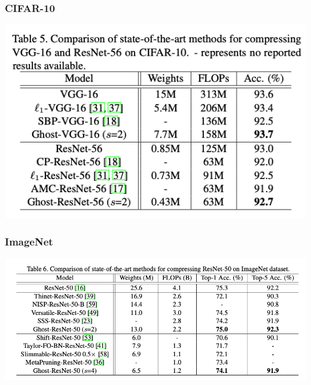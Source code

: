 \documentclass[12pt]{article}
\begin{document}
            \subsubsection{
                CIFAR-10
            }
                \begin{center}
                    \includegraphics[scale=0.4]{src/img/Com_cifar10.jpg} \\
                \end{center}
            \subsubsection{
                ImageNet
            }
                \begin{center}
                    \includegraphics[scale=0.4]{src/img/Com_imagenet.jpg} \\
                \end{center}
\end{document}

